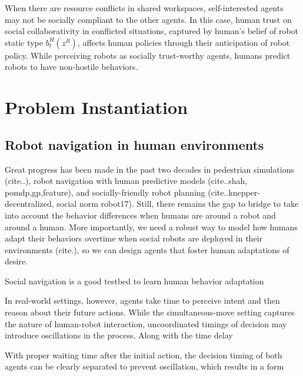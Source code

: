 \documentclass[letterpaper, 10 pt, conference]{ieeeconf}  %
\begin{document}
When there are resource conflicts in shared workspaces, 
self-interested agents may not be socially compliant to the other agents. 
In this case, human trust on social collaborativity in conflicted situations, 
captured by human's belief of robot static type $b^H_t(z^R)$, 
affects human policies through their anticipation of robot policy. While 
perceiving robots as socially 
trust-worthy agents, humans predict robots to have non-hostile behaviors.   

\section{Problem Instantiation}

\subsection{Robot navigation in human environments}
Great progress has been made in the past two decades in pedestrian simulations 
(cite..), robot navigation with human predictive models (cite..shah, pomdp,gp,feature), and 
socially-friendly robot planning (cite..knepper-decentralized, social norm 
robot17). Still, there remains the gap to bridge to take into account the 
behavior differences when humans are around a robot and around a human. More 
importantly, we need a robust way to model how humans adapt their behaviors 
overtime when social robots are deployed in their environments (cite.), so we 
can design agents that foster human adaptations of desire. 

Social navigation is a good testbed to learn human behavior adaptation


In real-world settings, however, agents take time to perceive intent and then reason 
about their future actions. While the simultaneous-move setting captures the 
nature of human-robot interaction, uncoordinated timings of decision may 
introduce oscillations in the process. Along with the time delay  


With proper waiting time after the initial action, the decision timing of both agents can be clearly 
separated to prevent oscillation, which results in a form  
\end{document}
